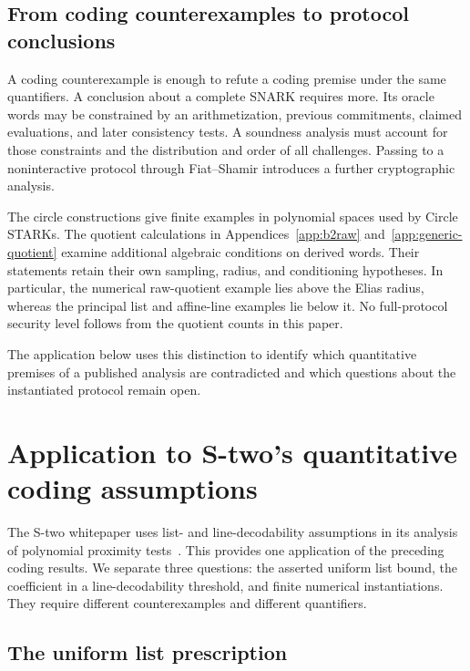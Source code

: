 \documentclass[11pt,letterpaper]{article}
\theoremstyle{definition}
\theoremstyle{remark}
\begin{document}
\subsection{From coding counterexamples to protocol conclusions}

A coding counterexample is enough to refute a coding premise under
the same quantifiers. A conclusion about a complete SNARK requires
more. Its oracle words may be constrained by an arithmetization,
previous commitments, claimed evaluations, and later consistency
tests. A soundness analysis must account for those constraints and
the distribution and order of all challenges. Passing to a
noninteractive protocol through Fiat--Shamir introduces a further
cryptographic analysis.

The circle constructions give finite examples in polynomial spaces
used by Circle STARKs. The quotient calculations in
Appendices~\ref{app:b2raw} and~\ref{app:generic-quotient} examine
additional algebraic conditions on derived words. Their statements
retain their own sampling, radius, and conditioning hypotheses.
In particular, the numerical raw-quotient example lies above the
Elias radius, whereas the principal list and affine-line examples
lie below it. No full-protocol security level follows from the
quotient counts in this paper.

The application below uses this distinction to identify which
quantitative premises of a published analysis are contradicted and
which questions about the instantiated protocol remain open.

\section{Application to S-two's quantitative coding assumptions}
\label{sec:stwo}

The S-two whitepaper uses list- and line-decodability assumptions in
its analysis of polynomial proximity tests~\cite{stwo}. This provides
one application of the preceding coding results. We separate three
questions: the asserted uniform list bound, the coefficient in a
line-decodability threshold, and finite numerical instantiations.
They require different counterexamples and different quantifiers.

\subsection{The uniform list prescription}
\end{document}
